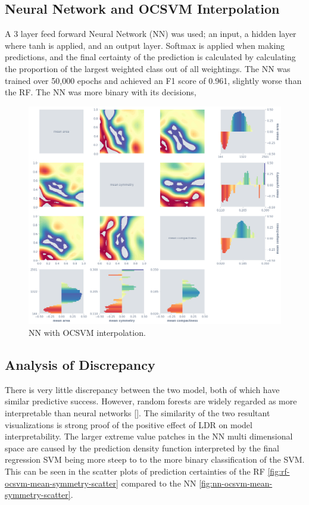 \documentclass[a4paperpaper,twocolumn]{article}
\begin{document}
\subsection{Neural Network and OCSVM Interpolation}

A 3 layer feed forward Neural Network (NN) was used; an input, a hidden layer where tanh is applied, and an output layer. Softmax is applied when making predictions, and the final certainty of the prediction is calculated by calculating the proportion of the largest weighted class out of all weightings. The NN was trained over 50,000 epochs and achieved an F1 score of 0.961, slightly worse than the RF. The NN was more binary with its decisions, 

\begin{figure}
\centering
\includegraphics[width=\columnwidth]{img/nn_ocsvm_matrix.png}
\caption{NN with OCSVM interpolation.}
\label{fig:rf-ocsvm-matrix}
\end{figure}

\subsection{Analysis of Discrepancy}

There is very little discrepancy between the two model, both of which have similar predictive success. However, random forests are widely regarded as more interpretable than neural networks []. The similarity of the two resultant visualizations is strong proof of the positive effect of LDR on model interpretability. The larger extreme value patches in the NN multi dimensional space are caused by the prediction density function interpreted by the final regression SVM being more steep to to the more binary classification of the SVM. This can be seen in the scatter plots of prediction certainties of the RF \ref{fig:rf-ocsvm-mean-symmetry-scatter} compared to the NN \ref{fig:nn-ocsvm-mean-symmetry-scatter}.
\end{document}
